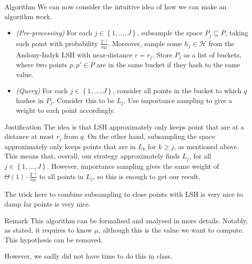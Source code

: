 \documentclass[a4paper]{article}
\begin{document}
\begin{parag}{Algorithm}
    We can now consider the intuitive idea of how we can make an algorithm work.
    \begin{itemize}[left=0pt]
        \item \textit{(Pre-processing)} For each $j \in \left\{1, \ldots, J\right\}$, subsample the space $P_j \subseteq P$, taking each point with probability $\frac{2^{-j}}{n \mu}$. Moreover, sample some $h_j \in \mathcal{H}$ from the Andony-Indyk LSH with near-distance $r = r_j$. Store $P_j$ as a list of buckets, where two points $p, p' \in P$ are in the same bucket if they hash to the same value.
        \item \textit{(Query)} For each $j \in \left\{1, \ldots, J\right\}$, consider all points in the bucket to which $q$ hashes in $P_j$. Consider this to be $L_j$. Use importance sampling to give a weight to each point accordingly.
    \end{itemize}

    \begin{subparag}{Justification}
        The idea is that LSH approximately only keeps point that are at a distance at most $r_j$ from $q$. On the other hand, subsampling the space approximately only keeps points that are in $L_k$ for $k \geq j$, as mentioned above. This means that, overall, our strategy approximately finds $L_j$, for all $j \in \left\{1, \ldots, J\right\}$. However, importance sampling gives the same weight of $\Theta\left(1\right)\cdot \frac{2^{-j}}{n \mu}$ to all points in $L_j$, so this is enough to get our result.

        The trick here to combine subsampling to close points with LSH is very nice to damp far points is very nice.
    \end{subparag}
    
    \begin{subparag}{Remark}
        This algorithm can be formalised and analysed in more details. Notably, as stated, it requires to know $\mu$, although this is the value we want to compute. This hypothesis can be removed.

        However, we sadly did not have time to do this in class.
    \end{subparag}
\end{parag}
\end{document}
